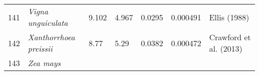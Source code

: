 \documentclass[]{article}
\begin{document}
\begin{longtable}[]{@{}lllllll@{}}
\begin{minipage}[t]{0.05\columnwidth}\raggedright
141\strut
\end{minipage} & \begin{minipage}[t]{0.23\columnwidth}\raggedright
\emph{Vigna unguiculata}\strut
\end{minipage} & \begin{minipage}[t]{0.05\columnwidth}\raggedright
9.102\strut
\end{minipage} & \begin{minipage}[t]{0.08\columnwidth}\raggedright
4.967\strut
\end{minipage} & \begin{minipage}[t]{0.08\columnwidth}\raggedright
0.0295\strut
\end{minipage} & \begin{minipage}[t]{0.08\columnwidth}\raggedright
0.000491\strut
\end{minipage} & \begin{minipage}[t]{0.23\columnwidth}\raggedright
Ellis (1988)\strut
\end{minipage}\tabularnewline
\begin{minipage}[t]{0.05\columnwidth}\raggedright
142\strut
\end{minipage} & \begin{minipage}[t]{0.23\columnwidth}\raggedright
\emph{Xanthorrhoea preissii}\strut
\end{minipage} & \begin{minipage}[t]{0.05\columnwidth}\raggedright
8.77\strut
\end{minipage} & \begin{minipage}[t]{0.08\columnwidth}\raggedright
5.29\strut
\end{minipage} & \begin{minipage}[t]{0.08\columnwidth}\raggedright
0.0382\strut
\end{minipage} & \begin{minipage}[t]{0.08\columnwidth}\raggedright
0.000472\strut
\end{minipage} & \begin{minipage}[t]{0.23\columnwidth}\raggedright
Crawford et al. (2013)\strut
\end{minipage}\tabularnewline
\begin{minipage}[t]{0.05\columnwidth}\raggedright
143\strut
\end{minipage} & \begin{minipage}[t]{0.23\columnwidth}\raggedright
\emph{Zea mays}\strut
\end{minipage} & \begin{minipage}[t]{0.05\columnwidth}\raggedright

\end{minipage}
\end{longtable}
\end{document}
